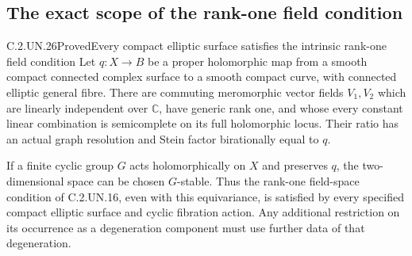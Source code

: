 \subsection{The exact scope of the rank-one field condition}

\begin{statement}{C.2.UN.26}{Proved}{Every compact elliptic surface satisfies the intrinsic rank-one field condition}
Let $q:X\to B$ be a proper holomorphic map from a
smooth compact connected complex surface to a smooth
compact curve, with connected elliptic general fibre.
There are commuting meromorphic vector fields $V_1,V_2$
which are linearly independent over $\mathbb C$, have
generic rank one, and whose every constant linear
combination is semicomplete on its full holomorphic
locus. Their ratio has an actual graph resolution and
Stein factor birationally equal to $q$.

If a finite cyclic group $G$ acts holomorphically on
$X$ and preserves $q$, the two-dimensional space can
be chosen $G$-stable. Thus the rank-one field-space
condition of C.2.UN.16, even with this equivariance,
is satisfied by every specified compact elliptic
surface and cyclic fibration action. Any additional
restriction on its occurrence as a degeneration
component must use further data of that degeneration.
\end{statement}

